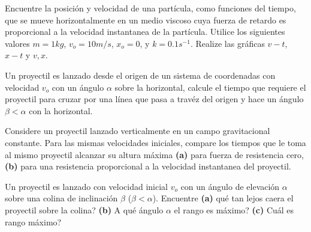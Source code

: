 \begin{mdframed}[style=warning]
	\begin{ejercicio}
		Encuentre la posición y velocidad de una partícula, como funciones del tiempo, que se mueve horizontalmente en un medio viscoso cuya fuerza de retardo es proporcional a la velocidad instantanea de la partícula. Utilice los siguientes valores $m = 1kg$, $v_o = 10m/s$, $x_o = 0$, y $k = 0.1s^{-1}$. Realize las gráficas $v-t$, $x-t$ y $v,x$.
	\end{ejercicio}
\end{mdframed}

\begin{mdframed}[style=warning]
	\begin{ejercicio}
		Un proyectil es lanzado desde el origen de un sistema de coordenadas con velocidad $v_o$ con un ángulo $\alpha$ sobre la horizontal, calcule el tiempo que requiere el proyectil para cruzar por una línea que pasa a travéz del origen y hace un ángulo $\beta < \alpha$ con la horizontal.
	\end{ejercicio}
\end{mdframed}

\begin{mdframed}[style=warning]
	\begin{ejercicio}
		Considere un proyectil lanzado verticalmente en un campo gravitacional constante. Para las mismas velocidades iniciales, compare los tiempos que le toma al mismo proyectil alcanzar su altura máxima \textbf{(a)} para fuerza de resistencia cero, \textbf{(b)} para una resistencia proporcional a la velocidad instantanea del proyectil.
	\end{ejercicio}
\end{mdframed}

\begin{mdframed}[style=warning]
	\begin{ejercicio}
		Un proyectil es lanzado con velocidad inicial $v_o$ con un ángulo de elevación $\alpha$ sobre una colina de inclinación $\beta$ ($\beta < \alpha$). Encuentre \textbf{(a)} qué tan lejos caera el proyectil sobre la colina? \textbf{(b)} A qué ángulo $\alpha$ el rango es máximo? \textbf{(c)} Cuál es rango máximo?
	\end{ejercicio}
\end{mdframed}
